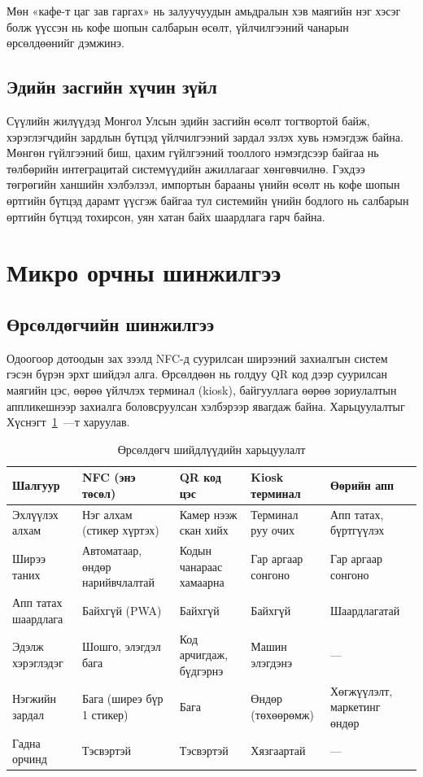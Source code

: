 Мөн «кафе-т цаг зав гаргах» нь залуучуудын амьдралын хэв маягийн нэг
хэсэг болж үүссэн нь кофе шопын салбарын өсөлт, үйлчилгээний чанарын
өрсөлдөөнийг дэмжинэ.

\subsection{Эдийн засгийн хүчин зүйл}

Сүүлийн жилүүдэд Монгол Улсын эдийн засгийн өсөлт тогтвортой байж,
хэрэглэгчдийн зардлын бүтцэд үйлчилгээний зардал эзлэх хувь нэмэгдэж
байна. Мөнгөн гүйлгээний биш, цахим гүйлгээний тооллого нэмэгдсээр
байгаа нь төлбөрийн интеграцитай системүүдийн ажиллагааг хөнгөвчилнө.
Гэхдээ төгрөгийн ханшийн хэлбэлзэл, импортын барааны үнийн өсөлт нь
кофе шопын өртгийн бүтцэд дарамт үүсгэж байгаа тул системийн үнийн
бодлого нь салбарын өртгийн бүтцэд тохирсон, уян хатан байх шаардлага
гарч байна.

\section{Микро орчны шинжилгээ}

\subsection{Өрсөлдөгчийн шинжилгээ}

Одоогоор дотоодын зах зээлд NFC-д суурилсан ширээний захиалгын систем
\cite{iso14443, nfcforum} гэсэн бүрэн эрхт шийдэл алга. Өрсөлдөөн нь голдуу QR код дээр суурилсан маягийн цэс, өөрөө үйлчлэх терминал (kiosk), байгууллага өөрөө
зориулалтын аппликешнээр захиалга боловсруулсан хэлбэрээр явагдаж байна.
Харьцуулалтыг Хүснэгт~\ref{tab:ch2-ursulduuch}~—т харуулав.

\begin{table}[h]
  \centering
  \caption{Өрсөлдөгч шийдлүүдийн харьцуулалт}
  \label{tab:ch2-ursulduuch}
  \small
  \begin{tabular}{@{}p{3.0cm}p{3.0cm}p{3.0cm}p{3.0cm}p{2.5cm}@{}}
    \toprule
    \textbf{Шалгуур} & \textbf{NFC (энэ төсөл)} & \textbf{QR код цэс} &
    \textbf{Kiosk терминал} & \textbf{Өөрийн апп} \\ \midrule
    Эхлүүлэх алхам & Нэг алхам (стикер хүртэх) & Камер нээж скан хийх &
    Терминал руу очих & Апп татах, бүртгүүлэх \\
    Ширээ таних & Автоматаар, өндөр нарийвчлалтай & Кодын чанараас
    хамаарна & Гар аргаар сонгоно & Гар аргаар сонгоно \\
    Апп татах шаардлага & Байхгүй (PWA) & Байхгүй & Байхгүй & Шаардлагатай \\
    Эдэлж хэрэглэдэг & Шошго, элэгдэл бага & Код арчигдаж, бүдгэрнэ &
    Машин элэгдэнэ & --- \\
    Нэгжийн зардал & Бага (ширеэ бүр 1 стикер) & Бага & Өндөр (төхөөрөмж) &
    Хөгжүүлэлт, маркетинг өндөр \\
    Гадна орчинд & Тэсвэртэй & Тэсвэртэй & Хязгаартай & --- \\
    \bottomrule
  \end{tabular}
\end{table}

